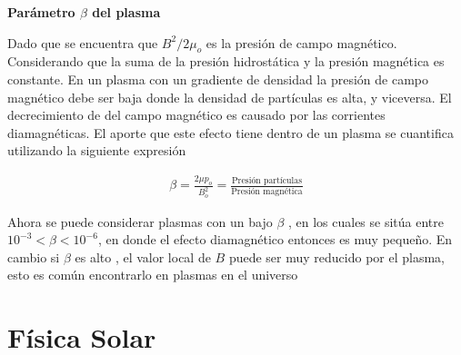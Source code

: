 \begin{itemize}
    \textbf{Parámetro $\beta$ del plasma}
    
    \noindent Dado que se encuentra que $B^{2}/2\mu_{o}$ es la presión de campo magnético. Considerando que la suma de la presión hidrostática y la presión magnética es constante. En un plasma con un gradiente de densidad la presión de campo magnético debe ser baja donde la densidad de partículas es alta, y viceversa. El decrecimiento de del campo magnético es causado por las corrientes diamagnéticas. El aporte que este efecto tiene dentro de un plasma se cuantifica utilizando la siguiente expresión 
    
    \begin{eqnarray}
    \beta = \frac{2\mu p_{o}}{B_{o}^{2}}=\frac{\text{Presión partículas}}{\text{Presión magnética}}
    \end{eqnarray}
    
    Ahora se puede considerar plasmas con un bajo $\beta$ , en los cuales se sitúa entre $10^{-3} < \beta < 10^{-6}$, en donde el efecto diamagnético entonces es muy pequeño. En cambio si $\beta$ es alto , el valor local de $B$ puede ser muy reducido por el plasma, esto es común encontrarlo en plasmas en el universo
\end{itemize}





\section{Física Solar }
